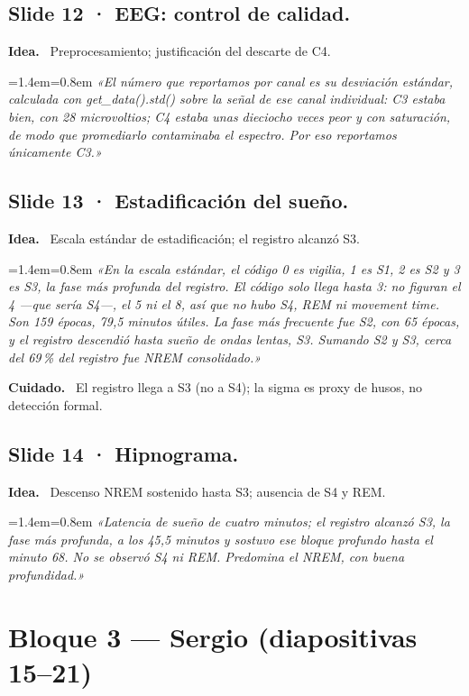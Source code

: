 \documentclass[11pt,a4paper]{article}
\newenvironment{guion}%
{\par\smallskip\begingroup\leftskip=1.4em\rightskip=0.8em\color{ink}\itshape}%
{\par\endgroup\smallskip}
\newcommand{\lab}[1]{\textbf{\color{ink}#1}\ }
\begin{document}
\subsection{Slide 12 · EEG: control de calidad.}
\lab{Idea.} Preprocesamiento; justificación del descarte de C4.
\begin{guion}
«El número que reportamos por canal es su desviación estándar, calculada con get\_data().std() sobre la
señal de ese canal individual: C3 estaba bien, con 28 microvoltios; C4 estaba unas dieciocho veces peor
y con saturación, de modo que promediarlo contaminaba el espectro. Por eso reportamos únicamente C3.»
\end{guion}

\subsection{Slide 13 · Estadificación del sueño.}
\lab{Idea.} Escala estándar de estadificación; el registro alcanzó S3.
\begin{guion}
«En la escala estándar, el código 0 es vigilia, 1 es S1, 2 es S2 y 3 es S3, la fase más profunda del
registro. El código solo llega hasta 3: no figuran el 4 ---que sería S4---, el 5 ni el 8, así que no hubo
S4, REM ni movement time. Son 159 épocas, 79,5 minutos útiles. La fase más frecuente fue S2, con 65
épocas, y el registro descendió hasta sueño de ondas lentas, S3. Sumando S2 y S3, cerca del 69\,\% del
registro fue NREM consolidado.»
\end{guion}
\lab{Cuidado.} El registro llega a S3 (no a S4); la sigma es proxy de husos, no detección formal.

\subsection{Slide 14 · Hipnograma.}
\lab{Idea.} Descenso NREM sostenido hasta S3; ausencia de S4 y REM.
\begin{guion}
«Latencia de sueño de cuatro minutos; el registro alcanzó S3, la fase más profunda, a los 45,5 minutos y
sostuvo ese bloque profundo hasta el minuto 68. No se observó S4 ni REM. Predomina el NREM, con buena
profundidad.»
\end{guion}

\section{Bloque 3 — Sergio (diapositivas 15--21)}
\end{document}
